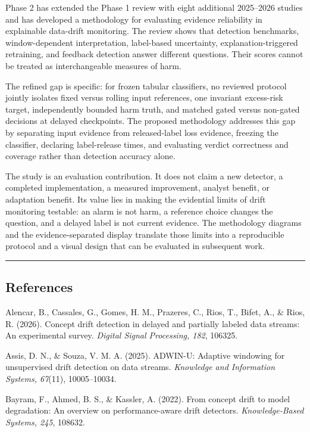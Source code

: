 \documentclass[
]{article}
\begin{document}
Phase 2 has extended the Phase 1 review with eight additional 2025--2026
studies and has developed a methodology for evaluating evidence
reliability in explainable data-drift monitoring. The review shows that
detection benchmarks, window-dependent interpretation, label-based
uncertainty, explanation-triggered retraining, and feedback detection
answer different questions. Their scores cannot be treated as
interchangeable measures of harm.

The refined gap is specific: for frozen tabular classifiers, no reviewed
protocol jointly isolates fixed versus rolling input references, one
invariant excess-risk target, independently bounded harm truth, and
matched gated versus non-gated decisions at delayed checkpoints. The
proposed methodology addresses this gap by separating input evidence
from released-label loss evidence, freezing the classifier, declaring
label-release times, and evaluating verdict correctness and coverage
rather than detection accuracy alone.

The study is an evaluation contribution. It does not claim a new
detector, a completed implementation, a measured improvement, analyst
benefit, or adaptation benefit. Its value lies in making the evidential
limits of drift monitoring testable: an alarm is not harm, a reference
choice changes the question, and a delayed label is not current
evidence. The methodology diagrams and the evidence-separated display
translate those limits into a reproducible protocol and a visual design
that can be evaluated in subsequent work.

\begin{center}\rule{0.5\linewidth}{0.5pt}\end{center}

\hypertarget{references}{%
\subsection{References}\label{references}}

Alencar, B., Cassales, G., Gomes, H. M., Prazeres, C., Rios, T., Bifet,
A., \& Rios, R. (2026). Concept drift detection in delayed and partially
labeled data streams: An experimental survey. \emph{Digital Signal
Processing, 182}, 106325.

Assis, D. N., \& Souza, V. M. A. (2025). ADWIN-U: Adaptive windowing for
unsupervised drift detection on data streams. \emph{Knowledge and
Information Systems, 67}(11), 10005--10034.

Bayram, F., Ahmed, B. S., \& Kassler, A. (2022). From concept drift to
model degradation: An overview on performance-aware drift detectors.
\emph{Knowledge-Based Systems, 245}, 108632.
\end{document}
